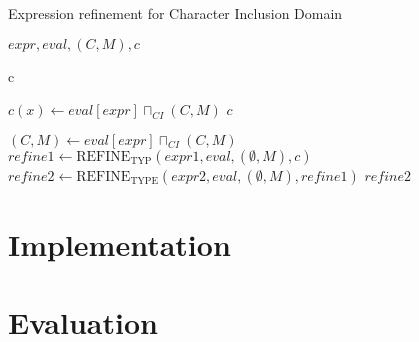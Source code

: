 \documentclass[10pt]{report}
\begin{document}
\begin{algorithm}[H]
	\caption{Expression refinement for Character Inclusion Domain} \label{refineC}
	\begin{algorithmic}
		 {$ expr, eval, (C, M), c$}
		
		\State \Return c
		\EndIf
		
		\State $ c(x) \gets eval[expr] \sqcap_{CI} (C, M)$
		\State \Return $ c $
		\EndIf
		
		\State $ (C, M) \gets eval[expr] \sqcap_{CI} (C, M)  $
		\State $ refine1 \gets \mathrm{REFINE}_{\mathrm{TYP}}(expr1, eval, (\emptyset, M), c) $
		\State $ refine2 \gets \mathrm{REFINE}_{\mathrm{TYPE}}(expr2, eval, (\emptyset, M), refine1) $
		\State \Return $ refine2 $
		\EndIf
		
		\EndFunction
	\end{algorithmic}
\end{algorithm}


\chapter{Implementation}

\chapter{Evaluation}



\end{document}
